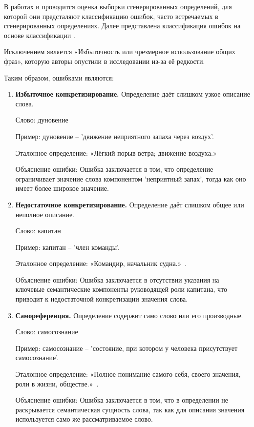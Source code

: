 \documentclass[LI,VKR]{HSEUniversity}
\begin{document}
В работах \cite{huang-etal-2021-definition} и \cite{noraset2016definition} проводится оценка выборки сгенерированных определений,
для которой они предсталяют классификацию ошибок,
часто встречаемых в сгенерированных определениях.
Далее представлена классификация ошибок на основе классификации \cite{huang-etal-2021-definition}.

Исключением является «Избыточность или чрезмерное использование общих фраз»,
которую авторы опустили в исследовании из-за её редкости.

Таким образом, ошибками являются:

\begin{enumerate}
\item \textbf{Избыточное конкретизирование.} Определение даёт слишком узкое описание слова.

   Слово: дуновение

   Пример: дуновение – ’движение неприятного запаха через воздух’.

   Эталонное определение: «Лёгкий порыв ветра; движение воздуха.»~\cite{TolkovyKuznetsov}

   Объяснение ошибки: Ошибка заключается в том, что определение ограничивает значение слова компонентом ’неприятный запах’, тогда как оно имеет более широкое значение.

\item \textbf{Недостаточное конкретизирование.} Определение даёт слишком общее или неполное описание.

   Слово: капитан

   Пример: капитан – ’член команды’.

   Эталонное определение: «Командир, начальник судна.»~\cite{TolkovyKuznetsov}.

   Объяснение ошибки: Ошибка заключается в отсутствии указания на ключевые семантические компоненты руководящей роли капитана, что приводит к недостаточной конкретизации значения слова.

\item \textbf{Самореференция.} Определение содержит само слово или его производные.

   Слово: самосознание

   Пример: самосознание – ’состояние, при котором у человека присутствует самосознание’.

   Эталонное определение: «Полное понимание самого себя, своего значения, роли в жизни, обществе.»~\cite{TolkovyKuznetsov}.

   Объяснение ошибки: Ошибка заключается в том, что в определении не раскрывается семантическая сущность слова, так как для описания значения используется само же рассматриваемое слово.


\end{enumerate}
\end{document}
